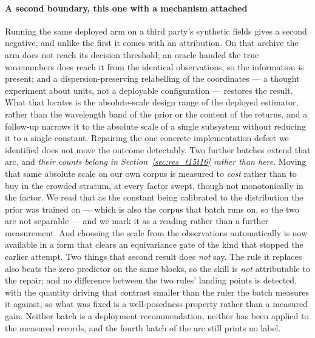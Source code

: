 \documentclass[review]{elsarticle}
\begin{document}
\paragraph{A second boundary, this one with a mechanism attached}
Running the same deployed arm on a third party's synthetic fields gives a second
negative, and unlike the first it comes with an attribution. On that archive the arm
does not reach its decision threshold; an oracle handed the true wavenumbers does
reach it from the identical observations, so the information is present; and a
dispersion-preserving relabelling of the coordinates --- a thought experiment about
units, not a deployable configuration --- restores the result. What that locates is
the absolute-scale design range of the deployed estimator, rather than the wavelength
band of the prior or the content of the returns, and a follow-up narrows it to the
absolute scale of a single subsystem without reducing it to a single constant.
Repairing the one concrete implementation defect we identified does not move the
outcome detectably.  Two further batches extend that arc, and \emph{their counts
belong in Section~\ref{sec:res_t15t16} rather than here}.  Moving that same absolute
scale on our own corpus is measured to \emph{cost} rather than to buy in the crowded
stratum, at every factor swept, though not monotonically in the factor.  We read that
as the constant being calibrated to the distribution the prior was trained on ---
which is also the corpus that batch runs on, so the two are not separable --- and we
mark it as a reading rather than a further measurement.
And choosing the scale from the observations automatically is now available in a form
that clears an equivariance gate of the kind that stopped the earlier attempt.  Two
things that second result does \emph{not} say.  The rule it replaces also beats the
zero predictor on the same blocks, so the skill is \emph{not} attributable to the
repair; and no difference between the two rules' landing points is detected, with the
quantity driving that contrast smaller than the ruler the batch measures it against,
so what was fixed is a well-posedness property rather than a measured gain.  Neither
batch is a deployment recommendation, neither has been applied to the measured
records, and the fourth batch of the arc still prints no label.
\end{document}
